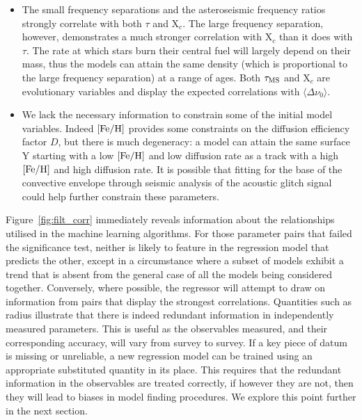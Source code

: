\begin{itemize}
\item The small frequency separations and the asteroseismic frequency ratios strongly correlate with both $\tau$ and X$_c$. The large frequency separation, however, demonstrates a much stronger correlation with X$_c$ than it does with $\tau$. The rate at which stars burn their central fuel will largely depend on their mass, thus the 
models can attain the same density (which is proportional to the large frequency separation) at a range of ages. Both $\tau_{\rm{MS}}$ and X$_c$ are evolutionary variables and display the expected correlations with $\langle\Delta\nu_0\rangle$. 

\item We lack the necessary information to constrain some of the initial model variables. Indeed $[\rm{Fe/H}]$ provides some constraints on the diffusion efficiency factor $D$, but there is much degeneracy: a model can attain the same surface Y starting with a low $[\rm{Fe/H}]$ and low diffusion rate as a track with a high $[\rm{Fe/H}]$ and high diffusion rate. It is possible that fitting for the base of the convective envelope through seismic analysis of the acoustic glitch signal \citep{2014ApJ...782...18M, 2014ApJ...794..114V} could help further constrain these parameters. 


\end{itemize}

Figure~\ref{fig:filt_corr} immediately reveals information about the relationships utilised in the machine learning algorithms. 
For those parameter pairs that failed the significance test, neither is likely to feature in the regression model that predicts the other, except in a circumstance where a subset of models exhibit a trend that is absent from the general case of all the models being considered together.
Conversely, where possible, the regressor will attempt to draw on information from pairs that display the strongest correlations.
Quantities such as radius illustrate that there is indeed redundant information in independently measured parameters.
This is useful as the observables measured, and their corresponding accuracy, will vary from survey to survey. 
If a key piece of datum is missing or unreliable, a new regression model can be trained using an appropriate substituted quantity in its place.   
This requires that the redundant information in the observables are treated correctly, if however they are not, then they will lead to biases in model finding procedures. We explore this point further in the next section.  


